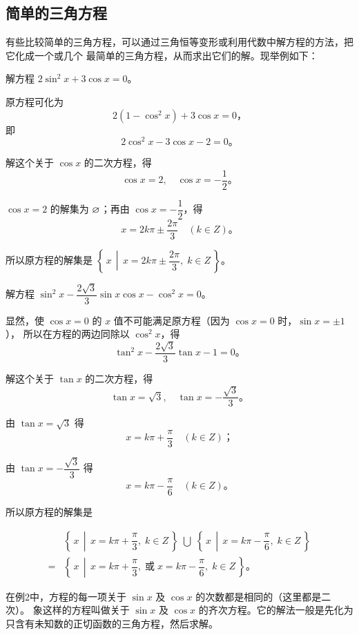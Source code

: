 \subsection{简单的三角方程}\label{subsec:1-6}

有些比较简单的三角方程，可以通过三角恒等变形或利用代数中解方程的方法，把它化成一个或几个
最简单的三角方程，从而求出它们的解。现举例如下：

\liti 解方程 $2\sin^2 x + 3\cos x = 0$。

\jie 原方程可化为
$$ 2(1 - \cos^2 x) + 3\cos x = 0 \text{，} $$
即
$$ 2\cos^2 x - 3\cos x - 2 = 0 \text{。}$$

解这个关于 $\cos x$ 的二次方程，得
$$ \cos x = 2, \quad \cos x = -\dfrac{1}{2} \text{。}$$

$\cos x = 2$ 的解集为 $\varnothing$；再由 $\cos x = -\dfrac{1}{2}$，得
$$ x = 2k\pi \pm \dfrac{2\pi}{3} \quad (k \in Z) \text{。}$$

所以原方程的解集是 $\left\{\, x \,\middle|\, x = 2k\pi \pm \dfrac{2\pi}{3}, \; k \in Z \,\right\}$。


\liti 解方程 $\sin^2 x - \dfrac{2\sqrt{3}}{3} \sin x \cos x - \cos^2 x = 0$。

\jie 显然，使 $\cos x = 0$ 的 $x$ 值不可能满足原方程（因为 $\cos x = 0$ 时，$\sin x = \pm 1$），
所以在方程的两边同除以 $\cos^2 x $，得
$$ \tan^2 x - \dfrac{2\sqrt{3}}{3}\tan x - 1 = 0 \text{。}$$

解这个关于 $\tan x$ 的二次方程，得
$$ \tan x = \sqrt{3}, \quad \tan x = -\dfrac{\sqrt{3}}{3} \text{。}$$

由 $\tan x = \sqrt{3}$ 得
$$ x = k\pi + \dfrac{\pi}{3} \quad (k \in Z) \text{；}$$

由 $\tan x = -\dfrac{\sqrt{3}}{3}$ 得
$$ x = k\pi - \dfrac{\pi}{6} \quad (k \in Z) \text{。}$$

所以原方程的解集是

\begin{align*}
    & \left\{\, x \,\middle|\, x = k\pi + \dfrac{\pi}{3}, \; k \in Z \,\right\} \;\bigcup\; \left\{\, x \,\middle|\, x = k\pi - \dfrac{\pi}{6}, \; k \in Z \,\right\} \\
   = & \left\{\, x \,\middle|\, x = k\pi + \dfrac{\pi}{3}, \;\text{或}\; x = k\pi - \dfrac{\pi}{6}, \; k \in Z \,\right\} \text{。}
\end{align*}

在例2中，方程的每一项关于 $\sin x$ 及 $\cos x$ 的次数都是相同的（这里都是二次）。
象这样的方程叫做关于 $\sin x$ 及 $\cos x$ 的齐次方程。它的解法一般是先化为只含有未知数的正切函数的三角方程，然后求解。

